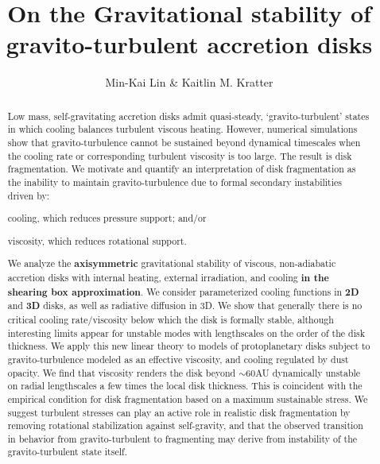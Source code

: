 \documentclass[iop, numberedappendix]{emulateapj}
\begin{document}
\title{On the Gravitational stability of gravito-turbulent accretion disks}
\author{Min-Kai Lin \& Kaitlin M. Kratter}

\begin{abstract}
  Low mass, self-gravitating accretion disks admit quasi-steady,
  `gravito-turbulent' states in which cooling balances turbulent viscous 
  heating. However, numerical simulations show that gravito-turbulence
  cannot be sustained beyond dynamical timescales when the cooling
  rate or corresponding turbulent viscosity is too large. The result is disk fragmentation.         
  We motivate and quantify an interpretation of disk 
  fragmentation as the inability to maintain gravito-turbulence due to  
  formal secondary instabilities driven by:  
\begin{inparaenum}[1)] 
\item 
  cooling, which reduces pressure support; and/or
\item 
  viscosity, which reduces rotational support. 
\end{inparaenum}
We analyze the {\bf axisymmetric} gravitational stability of viscous, non-adiabatic
accretion disks with internal heating, external irradiation, and
cooling {\bf in the shearing box approximation}.   
We consider parameterized cooling functions in {\bf 2D} and {\bf 3D}
disks, %
as well as   
radiative diffusion in 3D. We show that 
generally there is no critical cooling rate/viscosity below which 
the disk is formally stable, although interesting limits appear 
for unstable modes with lengthscales on the order of the disk thickness.   
We apply this new linear theory to 
models of protoplanetary disks subject to
gravito-turbulence modeled as an effective 
viscosity, and cooling regulated by dust opacity. 
We find that viscosity renders the disk beyond $\sim 60$AU dynamically
unstable on radial %
lengthscales a few times the local disk thickness. This is coincident 
with the empirical condition for disk fragmentation based on a
maximum sustainable stress. 
We suggest turbulent stresses can play an active role in realistic disk 
fragmentation by removing rotational stabilization against 
self-gravity, and that the observed transition in behavior from 
gravito-turbulent to fragmenting may derive from  
instability of the gravito-turbulent state itself.
\end{abstract}
\end{document}
